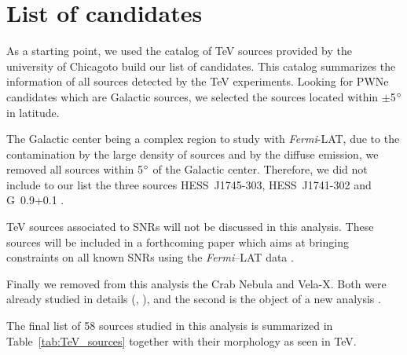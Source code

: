 \section{List of candidates}
As a starting point, we used the catalog of TeV sources provided by the university of Chicago\footnotemark[1] to build our list of candidates. This catalog summarizes the information of all sources detected by the TeV experiments. Looking for PWNe candidates which are Galactic sources, we selected the sources located within $\pm$5$\mbox{$^\circ$}$ in latitude.

The Galactic center being a complex region to study with \emph{Fermi}-LAT, due to the contamination by the large density of sources and by the diffuse emission, we removed all sources within 5$\mbox{$^\circ$}$ of the Galactic center. Therefore, we did not include to our list the three sources HESS~J1745-303, HESS~J1741-302 and G~0.9+0.1 \citep{Mouse, Mouse2}.

TeV sources associated to SNRs will not be discussed in this analysis. These sources will be included in a forthcoming paper which aims at bringing constraints on all known SNRs using the \emph{Fermi}--LAT data \cite{SNRcat}.

Finally we removed from this analysis the Crab Nebula and Vela-X. Both were already studied in details (\cite{2010ApJ...708.1254A}, \cite{2012ApJ...749...26B}), and the second is the object of a new analysis \cite{VelaX}. 

The final list of 58 sources studied in this analysis is summarized in Table~\ref{tab:TeV_sources} together with their morphology as seen in TeV. 
